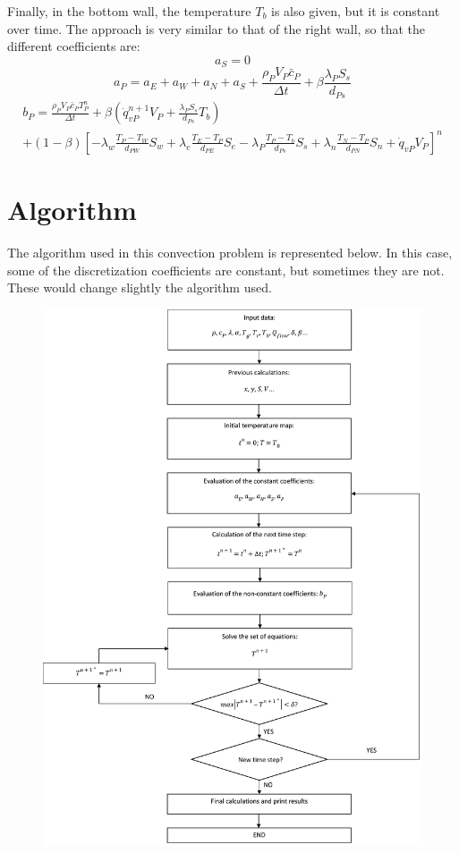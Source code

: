 Finally, in the bottom wall, the temperature $T_{b}$ is also given, but it is constant over time. The approach is very similar to that of the right wall, so that the different coefficients are:
\begin{equation}
a_{S}=0
\end{equation}
\begin{equation}
a_P=a_{E}+a_{W}+a_{N}+a_{S}+\frac{\rho_{P}V_{P}\bar{c}_{P}}{\Delta t}+\beta\frac{\lambda_{P}S_{s}}{d_{Ps}}
\end{equation}
\begin{multline}
b_{P}=\frac{\rho_{P}V_{P}\bar{c}_{P}T_{P}^{n}}{\Delta t}+\beta\left(\dot{q}_{vP}^{n+1}V_{P}+\frac{\lambda_{P}S_{s}}{d_{Ps}}T_{b}\right) \\
+\left(1-\beta\right)\left[-\lambda_{w}\frac{T_{P}-T_{W}}{d_{PW}}S_{w}+\lambda_{e}\frac{T_{E}-T_{P}}{d_{PE}}S_{e}-\lambda_{P}\frac{T_{P}-T_{b}}{d_{Ps}}S_{s}+\lambda_{n}\frac{T_{N}-T_{P}}{d_{PN}}S_{n}+\dot{q}_{vP}V_{P}\right]^{n}
\end{multline}

\section{Algorithm}
The algorithm used in this convection problem is represented below. In this case, some of the discretization coefficients are constant, but sometimes they are not. These would change slightly the algorithm used.
\begin{figure}[h!]
	\centering
	\includegraphics[scale=0.154]{FourMaterials/algorithm}
\end{figure}


